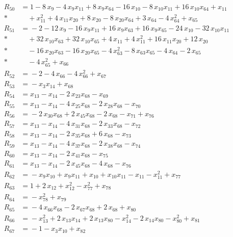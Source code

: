\begin{align*}
R_{50} &={} 1 -8\,x_{9} -4\,x_{9} x_{11} +8\,x_{9} x_{64} -16\,x_{10} -8\,x_{10} x_{11} +16\,x_{10} x_{64} +x_{11} \\*
&\quad{} +x_{11}^{2} +4\,x_{11} x_{20} +8\,x_{20} -8\,x_{20} x_{64} +3\,x_{64} -4\,x_{64}^{2} +x_{65} \\[2pt]
R_{51} &={} -2 -12\,x_{9} -16\,x_{9} x_{11} +16\,x_{9} x_{63} +16\,x_{9} x_{65} -24\,x_{10} -32\,x_{10} x_{11} \\*
&\quad{} +32\,x_{10} x_{63} +32\,x_{10} x_{65} +4\,x_{11} +4\,x_{11}^{2} +16\,x_{11} x_{20} +12\,x_{20} \\*
&\quad{} -16\,x_{20} x_{63} -16\,x_{20} x_{65} -4\,x_{63}^{2} -8\,x_{63} x_{65} -4\,x_{64} -2\,x_{65} \\*
&\quad{} -4\,x_{65}^{2} +x_{66} \\[2pt]
R_{52} &={} -2 -4\,x_{66} -4\,x_{66}^{2} +x_{67} \\[2pt]
R_{53} &={} -x_{3} x_{14} +x_{68} \\[2pt]
R_{54} &={} x_{13} -x_{14} -2\,x_{23} x_{68} -x_{69} \\[2pt]
R_{55} &={} x_{13} -x_{14} -4\,x_{25} x_{68} -2\,x_{28} x_{68} -x_{70} \\[2pt]
R_{56} &={} -2\,x_{30} x_{68} +2\,x_{45} x_{68} -2\,x_{68} -x_{71} +x_{76} \\[2pt]
R_{57} &={} x_{13} -x_{14} -4\,x_{31} x_{68} -2\,x_{33} x_{68} -x_{72} \\[2pt]
R_{58} &={} x_{13} -x_{14} -2\,x_{35} x_{68} +6\,x_{68} -x_{73} \\[2pt]
R_{59} &={} x_{13} -x_{14} -4\,x_{37} x_{68} -2\,x_{38} x_{68} -x_{74} \\[2pt]
R_{60} &={} x_{13} -x_{14} -2\,x_{41} x_{68} -x_{75} \\[2pt]
R_{61} &={} x_{13} -x_{14} -2\,x_{45} x_{68} -4\,x_{68} -x_{76} \\[2pt]
R_{62} &={} -x_{9} x_{10} +x_{9} x_{11} +x_{10} +x_{10} x_{11} -x_{11} -x_{11}^{2} +x_{77} \\[2pt]
R_{63} &={} 1 +2\,x_{12} +x_{12}^{2} -x_{77}^{2} +x_{78} \\[2pt]
R_{64} &={} -x_{78}^{2} +x_{79} \\[2pt]
R_{65} &={} -4\,x_{66} x_{68} -2\,x_{67} x_{68} +2\,x_{68} +x_{80} \\[2pt]
R_{66} &={} -x_{13}^{2} +2\,x_{13} x_{14} +2\,x_{13} x_{80} -x_{14}^{2} -2\,x_{14} x_{80} -x_{80}^{2} +x_{81} \\[2pt]
R_{67} &={} -1 -x_{3} x_{10} +x_{82} \\[2pt]

\end{align*}

